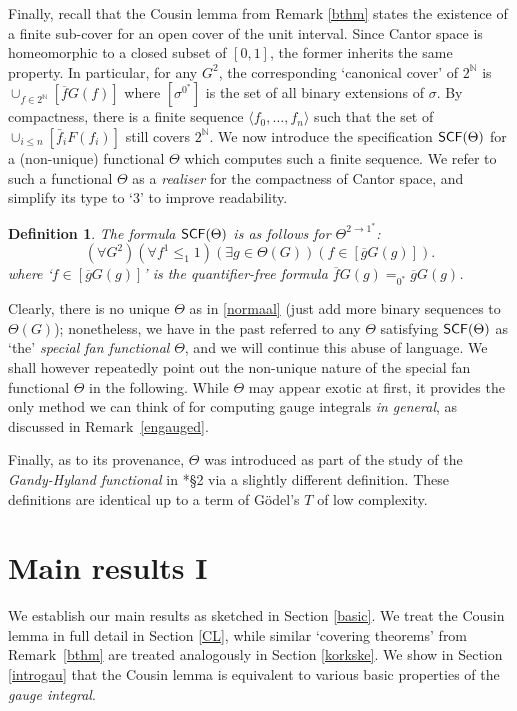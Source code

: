 \documentclass[reqno]{amsart}
\newtheorem{defi}[thm]{Definition}
\newcommand\be{\begin{equation}}
\newcommand\ee{\end{equation}}
\def\bdefi{\begin{defi}\rm}
\def\edefi{\end{defi}}
\def\N{{\mathbb  N}}
\def\di{\rightarrow}
\def\SCF{\textup{\textsf{SCF}}}
\numberwithin{equation}{section}
\numberwithin{thm}{section}
\begin{document}
Finally, recall that the Cousin lemma from Remark \ref{bthm} states the existence of a finite sub-cover for an open cover of the unit interval. 
Since Cantor space is homeomorphic to a closed subset of $[0,1]$, the former inherits the same property.  
In particular, for any $G^{2}$, the corresponding `canonical cover' of $2^{\N}$ is $\cup_{f\in 2^{\N}}[\overline{f}G(f)]$ where $[\sigma^{0^{*}}]$ is the set of all binary extensions of $\sigma$.  By compactness, there is a finite sequence $\langle f_0 , \ldots , f_n\rangle$ such that the set of $\cup_{i\leq n}[\bar f_{i} F(f_i)]$ still covers $2^{\N}$.  
We now introduce the specification $\SCF(\Theta)$ for a (non-unique) functional $\Theta$ which computes such a finite sequence.  
We refer to such a functional $\Theta$ as a \emph{realiser} for the compactness of Cantor space, and simplify its type to `$3$' to improve readability.
\bdefi\label{dodier}
The formula $\SCF(\Theta)$ is as follows for $\Theta^{2\di 1^{*}}$:
\be\label{normaal}
(\forall G^{2})(\forall f^{1}\leq_{1}1)(\exists g\in \Theta(G))(f\in [\overline{g}G(g)]).
\ee
where `$f\in [\overline{g}G(g)]$' is the quantifier-free formula $\overline{f}G(g)=_{0^{*}}\overline{g}G(g)$.
\edefi
Clearly, there is no unique $\Theta$ as in \eqref{normaal} (just add more binary sequences to $\Theta(G)$); nonetheless, 
we have in the past referred to any $\Theta$ satisfying $\SCF(\Theta)$ as `the' \emph{special fan functional} $\Theta$, and we will continue this abuse of language.  
We shall however repeatedly point out the non-unique nature of the special fan functional $\Theta$ in the following.   While $\Theta$ may appear exotic at first, it provides the only method we can think of for computing gauge integrals \emph{in general}, as discussed in Remark~\ref{engauged}.   

\smallskip

Finally, as to its provenance, $\Theta$ was introduced as part of the study of the \emph{Gandy-Hyland functional} in \cite{samGH}*{\S2} via a slightly different definition.  
These definitions are identical up to a term of G\"odel's $T$ of low complexity.  

\section{Main results I}\label{fullviewdownmainstreet1}
We establish our main results as sketched in Section \ref{basic}.   %
We treat the Cousin lemma in full detail in Section \ref{CL}, while similar `covering theorems' from Remark~\ref{bthm} 
are treated analogously in Section \ref{korkske}.  We show in Section \ref{introgau} that the Cousin lemma is equivalent to various basic properties of the \emph{gauge integral}.
\end{document}
